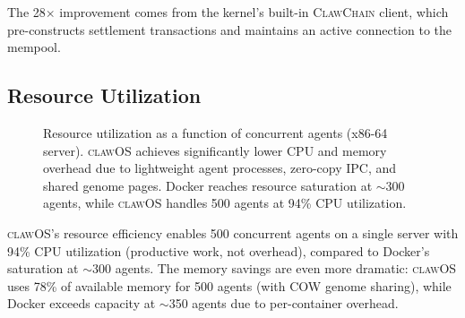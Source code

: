 \documentclass{article}
\newcommand{\clawos}{\textsc{clawOS}}
\newcommand{\clawchain}{\textsc{ClawChain}}
\begin{document}
The 28$\times$ improvement comes from the kernel's built-in \clawchain{} client, which pre-constructs settlement transactions and maintains an active connection to the mempool.

\subsection{Resource Utilization}

\begin{figure}[t]
\centering
{}
\caption{Resource utilization as a function of concurrent agents (x86-64 server). \clawos{} achieves significantly lower CPU and memory overhead due to lightweight agent processes, zero-copy IPC, and shared genome pages. Docker reaches resource saturation at $\sim$300 agents, while \clawos{} handles 500 agents at 94\% CPU utilization.}
\label{fig:utilization}
\end{figure}

\clawos{}'s resource efficiency enables 500 concurrent agents on a single server with 94\% CPU utilization (productive work, not overhead), compared to Docker's saturation at $\sim$300 agents. The memory savings are even more dramatic: \clawos{} uses 78\% of available memory for 500 agents (with COW genome sharing), while Docker exceeds capacity at $\sim$350 agents due to per-container overhead.
\end{document}
